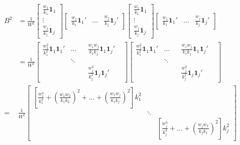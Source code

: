 \begin{equation}
    \begin{split}
        B^2 & = \frac{1}{W^2}\begin{bmatrix}
            \frac{w_1}{k_1}\mathbf{1}_1 \\
            \vdots \\
            \frac{w_j}{k_j}\mathbf{1}_j
        \end{bmatrix} \begin{bmatrix}
            \frac{w_1}{k_1}\mathbf{1}_1' & \dots & \frac{w_j}{k_j}\mathbf{1}_j'  
        \end{bmatrix}\begin{bmatrix}
            \frac{w_1}{k_1}\mathbf{1}_1 \\
            \vdots \\
            \frac{w_j}{k_j}\mathbf{1}_j
        \end{bmatrix} \begin{bmatrix}
            \frac{w_1}{k_1}\mathbf{1}_1' & \dots & \frac{w_j}{k_j}\mathbf{1}_j'  
        \end{bmatrix} \\
        & = \frac{1}{W^2}\begin{bmatrix}
             \frac{w_1^2}{k_1^2}\mathbf{1}_1\mathbf{1}_1'& \dots & &\frac{w_1w_j}{k_1k_j}\mathbf{1}_1\mathbf{1}_j' \\
             & \ddots & & &\\
             & & &  \frac{w_j^2}{k_j^2}\mathbf{1}_j\mathbf{1}_j'
        \end{bmatrix} \begin{bmatrix}
             \frac{w_1^2}{k_1^2}\mathbf{1}_1\mathbf{1}_1'& \dots & &\frac{w_1w_j}{k_1k_j}\mathbf{1}_1\mathbf{1}_j' \\
             & \ddots & & &\\
             & & &  \frac{w_j^2}{k_j^2}\mathbf{1}_j\mathbf{1}_j'
        \end{bmatrix} \\
        = & \frac{1}{W^2}\begin{bmatrix}
            \left[\frac{w_1^4}{k_1^4} + \left( \frac{w_1w_2}{k_1k_2} \right)^2 + \dots + \left( \frac{w_1w_j}{k_1k_j} \right)^2  \right] k_1^2 & & \\
            & \ddots & \\
            & & \left[\frac{w_j^4}{k_j^4} +  \dots + \left( \frac{w_jw_1}{k_jk_1} \right)^2  \right] k_j^2
        \end{bmatrix}
    \end{split}
    \nonumber
\end{equation}

